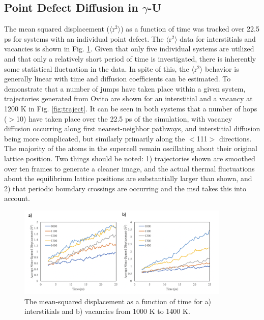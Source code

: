 \documentclass[review]{elsarticle}
\begin{document}
\FloatBarrier

\subsection{Point Defect Diffusion in $\gamma$-U}

The mean squared displacement ($\langle$r$^2$$\rangle$) as a function of time was tracked over 22.5 ps for systems with an individual point defect. The $\langle$r$^2$$\rangle$ data for interstitials and vacancies is shown in Fig. \ref{fig:rsquare}. Given that only five individual systems are utilized and that only a relatively short period of time is investigated, there is inherently some statistical fluctuation in the data. In spite of this, the $\langle$r$^2$$\rangle$ behavior is generally linear with time and diffusion coefficients can be estimated. To demonstrate that a number of jumps have taken place within a given system, trajectories generated from Ovito \cite{ovito} are shown for an interstitial and a vacancy at 1200 K in Fig. \ref{fig:traject}. It can be seen in both systems that a number of hops ($>$10) have taken place over the 22.5 ps of the simulation, with vacancy diffusion occurring along first nearest-neighbor pathways, and interstitial diffusion being more complicated, but similarly primarily along the $<$111$>$ directions. The majority of the atoms in the supercell remain oscillating about their original lattice position. Two things should be noted: 1) trajectories shown are smoothed over ten frames to generate a cleaner image, and the actual thermal fluctuations about the equilibrium lattice positions are substantially larger than shown, and 2) that periodic boundary crossings are occurring and the msd takes this into account. 



 \begin{figure}[h]
 \centering
 \includegraphics[width=0.9\textwidth]{6_msd.png} 
 \caption{The mean-squared displacement as a function of time for a) interstitials and b) vacancies from 1000 K to 1400 K.  }
 \label{fig:rsquare}
\end{figure}
\end{document}
